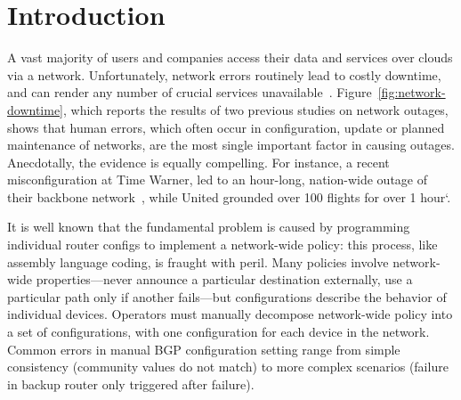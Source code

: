 \section{Introduction}

A vast majority of users and companies access their data and services over clouds via a network.  Unfortunately, network errors routinely lead to costly downtime, and can render any number of crucial services unavailable~\cite{mahajan+:bgp-misconfiguration,feamster+:rcc,batfish,dc-failure-study}.
Figure~\ref{fig:network-downtime}, which reports the results of two
previous studies on network outages, shows that human errors, which often occur in configuration, update or planned maintenance of networks, are the most single important factor in causing outages.  Anecdotally, the evidence is equally compelling.  For instance, a recent misconfiguration at
Time Warner, led to an hour-long, nation-wide outage of their backbone network~\cite{time-warner}, while United grounded over 100 flights for over 1 hour`\cite{united}.

It is well known that the fundamental problem is caused by programming individual router configs to implement a network-wide policy: this process, like assembly language coding, is fraught with peril.  Many policies involve network-wide properties---never announce a particular destination externally, use a particular path only if another fails---but configurations describe the behavior of individual devices.  Operators must manually decompose network-wide policy into a set of configurations, with one configuration for each device in the network. Common errors in manual BGP configuration setting range from simple consistency (community values do not match) to more complex scenarios (failure in backup router only triggered after failure). 



